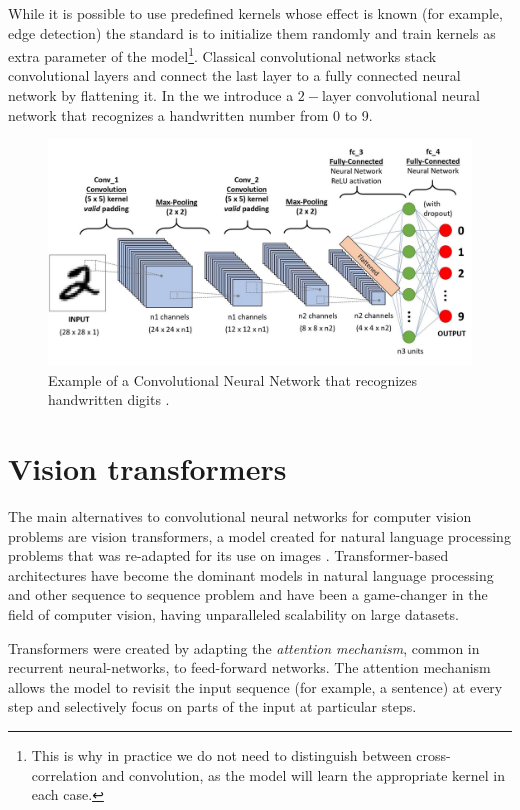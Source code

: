 While it is possible to use predefined kernels whose effect is known (for example, edge detection) the standard is to initialize them randomly and train kernels as extra parameter of the model\footnote{This is why in practice we do not need to distinguish between cross-correlation and convolution, as the model will learn the appropriate kernel in each case.}. Classical convolutional networks stack convolutional layers and connect the last layer to a fully connected neural network by flattening it. In the  we introduce a $2-$layer convolutional neural network that recognizes a handwritten number from 0 to 9.
\begin{figure}[tb]
    \centering
    \includegraphics[width=\textwidth]{figures/chapter2/clasicalArch.jpeg}
    \caption{Example of a Convolutional Neural Network that recognizes handwritten digits \cite{classicCNN}.}
    \label{fig:archExample}
\end{figure}

\section{Vision transformers} \label{sec:transformer}
The main alternatives to convolutional neural networks for computer vision problems are vision transformers, a model created for natural language processing problems that was re-adapted for its use on images \cite{vaswani2017attention}. Transformer-based architectures have become the dominant models in natural language processing and other sequence to sequence problem and have been a game-changer in the field of computer vision, having unparalleled scalability on large datasets.

Transformers were created by adapting the \textit{attention mechanism}, common in recurrent neural-networks, to feed-forward networks. The attention mechanism allows the model to revisit the input sequence (for example, a sentence) at every step and selectively focus on parts of the input at particular steps.


